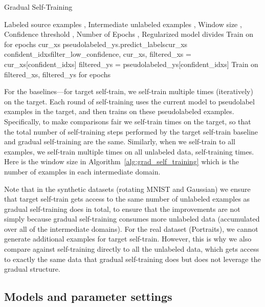 \documentclass[11pt]{article}
\begin{document}
\begin{algorithm}[tb]
   \caption{Gradual Self-Training}
   \label{alg:grad_self_training}
\begin{algorithmic}
    Labeled source examples , Intermediate unlabeled examples , Window size , Confidence threshold , Number of Epochs , Regularized model 
     divides 
   \STATE Train  on  for  epochs
   \STATE cur\_xs
   \STATE pseudolabeled\_ys.predict\_labelscur\_xs
   \STATE confident\_idxsfilter\_low\_confidence, cur\_xs, 
   \STATE filtered\_xs = cur\_xs[confident\_idxs]
   \STATE filtered\_ys = pseudolabeled\_ys[confident\_idxs]
   \STATE Train  on filtered\_xs, filtered\_ys for  epochs
   \ENDFOR
\end{algorithmic}
\end{algorithm}

For the baselines---for target self-train, we self-train multiple times (iteratively) on the target. Each round of self-training uses the current model  to pseudolabel examples in the target, and then trains on these pseudolabeled examples. Specifically, to make comparisons fair we self-train  times on the target, so that the total number of self-training steps performed by the target self-train baseline and gradual self-training are the same. Similarly, when we self-train to all examples, we self-train multiple times on all unlabeled data, self-training  times. Here  is the window size in Algorithm~\ref{alg:grad_self_training} which is the number of examples in each intermediate domain.

Note that in the synthetic datasets (rotating MNIST and Gaussian) we ensure that target self-train gets access to the same number of unlabeled examples as gradual self-training does in total, to ensure that the improvements are not simply because gradual self-training consumes more unlabeled data (accumulated over all of the intermediate domains). For the real dataset (Portraits), we cannot generate additional examples for target self-train. However, this is why we also compare against self-training directly to all the unlabeled data, which gets access to exactly the same data that gradual self-training does but does not leverage the gradual structure.

\subsection{Models and parameter settings}
\end{document}
